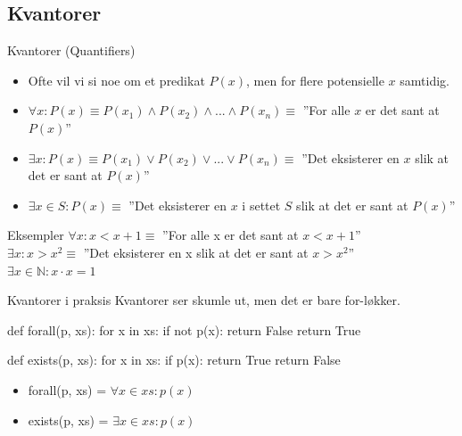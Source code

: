 \subsection{Kvantorer}
\begin{frame}{Kvantorer (Quantifiers)}
    \begin{itemize}
        \item Ofte vil vi si noe om et predikat $P(x)$, men for flere potensielle $x$ samtidig.
        \pause
        \item $\forall x : P(x) \equiv P(x_1) \land P(x_2) \land ... \land P(x_n) \equiv$ ''For alle $x$ er det sant at $P(x)$''
        \pause
        \item $\exists x : P(x) \equiv P(x_1) \lor P(x_2) \lor ... \lor P(x_n) \equiv$ ''Det eksisterer en $x$ slik at det er sant at $P(x)$''
        \pause
        \item $\exists x \in S : P(x) \equiv$ ''Det eksisterer en $x$ i settet $S$ slik at  det er sant at $P(x)$''
    \end{itemize}
    
    \pause

    \begin{block}{Eksempler}
        $\forall x : x < x + 1 \equiv$ ''For alle x er det sant at $x < x +1$''\\
        $\exists x : x > x^2 \equiv$ ''Det eksisterer en x slik at det er sant at $x > x^2$''\\
        $\exists x \in \mathbb{N} : x \cdot x = 1$\\
    \end{block}
\end{frame}

\begin{frame}[fragile]{Kvantorer i praksis}
    Kvantorer ser skumle ut, men det er bare for-løkker.
    \begin{python}
def forall(p, xs):
    for x in xs:
        if not p(x):
            return False
    return True
    
def exists(p, xs):
    for x in xs:
        if p(x):
            return True
    return False
    \end{python}
    
    \pause
    \begin{itemize}
        \item forall(p, xs) = $\forall x \in xs : p(x)$        
        \item exists(p, xs) = $\exists x \in xs : p(x)$
    \end{itemize}
\end{frame}

